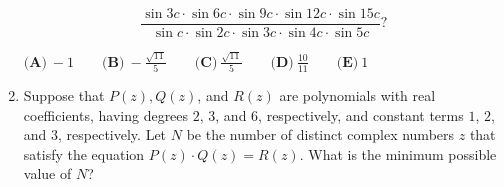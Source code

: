 \documentclass{article}
\begin{document}
\begin{enumerate}[label=\arabic*., itemsep=0.5em]
\begin{equation*}
\frac{\sin 3c \cdot \sin 6c \cdot \sin 9c \cdot \sin 12c \cdot \sin 15c}{\sin c \cdot \sin 2c \cdot \sin 3c \cdot \sin 4c \cdot \sin 5c}?
\end{equation*}


\(\textbf{(A)}\ {-}1 \qquad\textbf{(B)}\ {-}\frac{\sqrt{11}}{5} \qquad\textbf{(C)}\ \frac{\sqrt{11}}{5} \qquad\textbf{(D)}\
\frac{10}{11} \qquad\textbf{(E)}\ 1\)\par \vspace{0.5em}\item Suppose that \(P(z), Q(z)\), and \(R(z)\) are polynomials with real coefficients, having degrees \(2\), \(3\), and \(6\), respectively, and constant terms \(1\), \(2\), and \(3\), respectively. Let \(N\) be the number of distinct complex numbers \(z\) that satisfy the equation \(P(z) \cdot Q(z)=R(z)\). What is the minimum possible value of \(N\)?


\end{enumerate}
\end{document}
